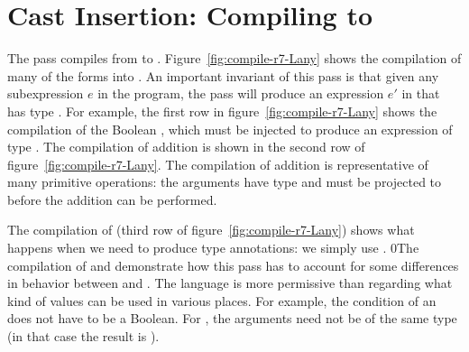 \documentclass[7x10]{TimesAPriori_MIT}%
\def\racketEd{0}
\def\edition{1}
\newcommand{\racket}[1]{{\if\edition\racketEd{#1}\fi}}
\numberwithin{theorem}{chapter}
\numberwithin{definition}{chapter}
\numberwithin{equation}{chapter}
\begin{document}
\section{Cast Insertion: Compiling \LangDyn{} to \LangAny{}}
\label{sec:compile-r7}

The  pass compiles from \LangDyn{} to \LangAny{}.
Figure~\ref{fig:compile-r7-Lany} shows the compilation of many of the
\LangDyn{} forms into \LangAny{}. An important invariant of this pass
is that given any subexpression $e$ in the \LangDyn{} program, the
pass will produce an expression $e'$ in \LangAny{} that has type
\ANYTY{}. For example, the first row in
figure~\ref{fig:compile-r7-Lany} shows the compilation of the Boolean
\TRUE{}, which must be injected to produce an expression of type
\ANYTY{}.
%
The compilation of addition is shown in the second row of
figure~\ref{fig:compile-r7-Lany}. The compilation of addition is
representative of many primitive operations: the arguments have type
\ANYTY{} and must be projected to \INTTYPE{} before the addition can
be performed.

The compilation of  (third row of
figure~\ref{fig:compile-r7-Lany}) shows what happens when we need to
produce type annotations: we simply use \ANYTY{}.
%
\racket{The compilation of  and   demonstrate how
  this pass has to account for some differences in behavior between
  \LangDyn{} and \LangAny{}. The \LangDyn{} language is more
  permissive than \LangAny{} regarding what kind of values can be used
  in various places. For example, the condition of an \key{if} does
  not have to be a Boolean. For \key{eq?}, the arguments need not be
  of the same type (in that case the result is \code{\#f}).}
\end{document}
